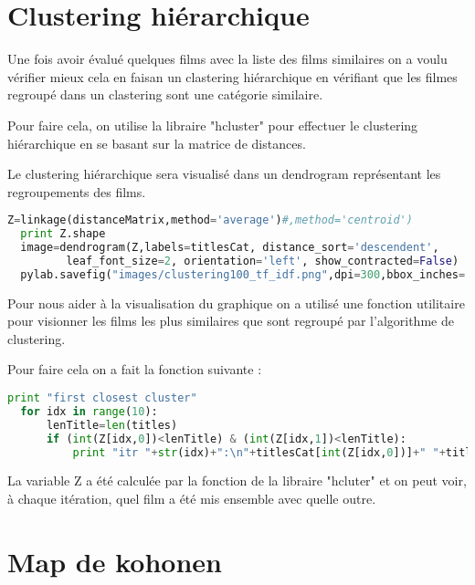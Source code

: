 \section{Clustering hiérarchique}

Une fois avoir évalué quelques films avec la liste des films similaires on a voulu vérifier mieux cela en faisan un clastering hiérarchique en vérifiant que les filmes regroupé dans un clastering sont une catégorie similaire.

Pour faire cela, on utilise la libraire "hcluster" pour effectuer le clustering hiérarchique en se basant sur la matrice de distances.

Le clustering hiérarchique sera visualisé dans un dendrogram représentant les regroupements des films. \\

\begin{lstlisting}[language=python]
  Z=linkage(distanceMatrix,method='average')#,method='centroid')
  print Z.shape
  image=dendrogram(Z,labels=titlesCat, distance_sort='descendent',
         leaf_font_size=2, orientation='left', show_contracted=False)
  pylab.savefig("images/clustering100_tf_idf.png",dpi=300,bbox_inches='tight')	 	  
\end{lstlisting}

Pour nous aider à la visualisation du graphique on a utilisé une fonction utilitaire pour visionner les films les plus similaires que sont regroupé par l'algorithme de clustering.

Pour faire cela on a fait la fonction suivante : \\

\begin{lstlisting}[language=python]
  print "first closest cluster"
  for idx in range(10):
      lenTitle=len(titles)
      if (int(Z[idx,0])<lenTitle) & (int(Z[idx,1])<lenTitle):
          print "itr "+str(idx)+":\n"+titlesCat[int(Z[idx,0])]+" "+titlesCat[int(Z[idx,1])]
\end{lstlisting}

La variable Z a été calculée par la fonction de la libraire "hcluter" et on peut voir, à chaque itération, quel film a été mis ensemble avec quelle outre.	


\section{Map de kohonen}

